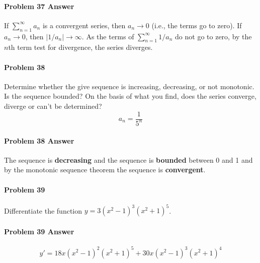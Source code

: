 \documentclass[a4paper, 11pt]{article}
\begin{document}
\paragraph{Problem 37 Answer}
If $\sum_{n=1}^{\infty} a_n$ is a convergent series, then $a_n \rightarrow 0$ (i.e., the terms go to zero).
If $a_n \rightarrow 0$, then $|1/a_n| \rightarrow \infty $.
As the terms of $\sum_{n=1}^{\infty} 1/a_n$ do not go to zero, by the $n$th term test for divergence, the series diverges.


\paragraph{Problem 38}
Determine whether the give sequence is increasing, decreasing, or not monotonic.
Is the sequence bounded?  On the basis of what you find, does the series converge, diverge or can't be determined?
\[
	a_n = \frac{1}{5^n}
\]


\paragraph{Problem 38 Answer}
The sequence is \textbf{decreasing} and the sequence is \textbf{bounded} between 0 and 1 and by the monotonic sequence theorem the sequence is \textbf{convergent}.


\paragraph{Problem 39}
Differentiate the function $y = 3(x^2-1)^3 (x^2 + 1)^5$.


\paragraph{Problem 39 Answer}
\[
	y' = 18x(x^2-1)^2 (x^2+1)^5 + 30x(x^2-1)^3 (x^2 + 1)^4
\]
\end{document}
